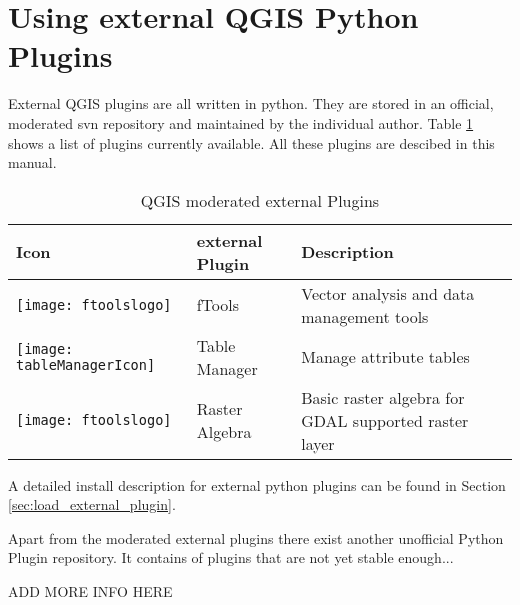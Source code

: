 \section{Using external QGIS Python Plugins}\label{sec:external_plugins}

\updatedisclaimer

External QGIS plugins are all written in python. They are stored in 
an official, moderated svn repository and maintained by the individual 
author. Table \ref{tab:external_plugins} shows a list of plugins 
currently available. All these plugins are descibed in this manual.

\begin{table}[H]
\centering
\caption{QGIS moderated external Plugins}\label{tab:external_plugins}\medskip
\small
 \begin{tabular}{|l|l|p{4in}|}
\hline \textbf{Icon} & \textbf{external Plugin} & \textbf{Description}\\
\hline
\texttt{[image: ftoolslogo]}
 & fTools \index{plugins!fTools} & Vector analysis and data management tools\\
\hline
\texttt{[image: tableManagerIcon]}
 & Table Manager \index{plugins!Table Manager}& Manage attribute tables \\
\hline
\texttt{[image: ftoolslogo]}
 & Raster Algebra \index{plugins!Raster Algebra}& Basic raster algebra 
for GDAL supported raster layer\\
\hline
\end{tabular}
\end{table}

A detailed install description for external python plugins can be found in 
Section \ref{sec:load_external_plugin}.


Apart from the moderated external plugins there exist another unofficial 
Python Plugin repository. It contains of plugins that are not yet stable 
enough... 

ADD MORE INFO HERE 

\begin{Tip} \caption{\textsc{Add more external Plugins}}
\end{Tip}




